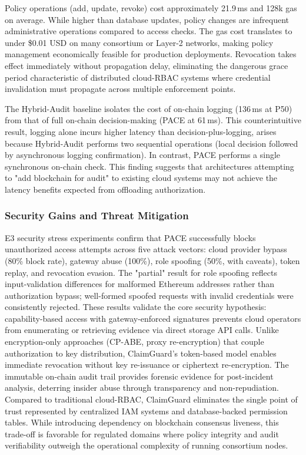 \documentclass[pdflatex,sn-mathphys-num]{sn-jnl}
\begin{document}
Policy operations (add, update, revoke) cost approximately 21.9\,ms and 128k gas on average. While higher than database updates, policy changes are infrequent administrative operations compared to access checks. The gas cost translates to under \$0.01 USD on many consortium or Layer-2 networks, making policy management economically feasible for production deployments. Revocation takes effect immediately without propagation delay, eliminating the dangerous grace period characteristic of distributed cloud-RBAC systems where credential invalidation must propagate across multiple enforcement points.

The Hybrid-Audit baseline isolates the cost of on-chain logging (136\,ms at P50) from that of full on-chain decision-making (PACE at 61\,ms). This counterintuitive result, logging alone incurs higher latency than decision-plus-logging, arises because Hybrid-Audit performs two sequential operations (local decision followed by asynchronous logging confirmation). In contrast, PACE performs a single synchronous on-chain check. This finding suggests that architectures attempting to "add blockchain for audit" to existing cloud systems may not achieve the latency benefits expected from offloading authorization.

\subsubsection{Security Gains and Threat Mitigation}

E3 security stress experiments confirm that PACE successfully blocks unauthorized access attempts across five attack vectors: cloud provider bypass (80\% block rate), gateway abuse (100\%), role spoofing (50\%, with caveats), token replay, and revocation evasion. The "partial" result for role spoofing reflects input-validation differences for malformed Ethereum addresses rather than authorization bypass; well-formed spoofed requests with invalid credentials were consistently rejected. These results validate the core security hypothesis: capability-based access with gateway-enforced signatures prevents cloud operators from enumerating or retrieving evidence via direct storage API calls. Unlike encryption-only approaches (CP-ABE, proxy re-encryption) that couple authorization to key distribution, ClaimGuard's token-based model enables immediate revocation without key re-issuance or ciphertext re-encryption. The immutable on-chain audit trail provides forensic evidence for post-incident analysis, deterring insider abuse through transparency and non-repudiation. Compared to traditional cloud-RBAC, ClaimGuard eliminates the single point of trust represented by centralized IAM systems and database-backed permission tables. While introducing dependency on blockchain consensus liveness, this trade-off is favorable for regulated domains where policy integrity and audit verifiability outweigh the operational complexity of running consortium nodes.
\end{document}
